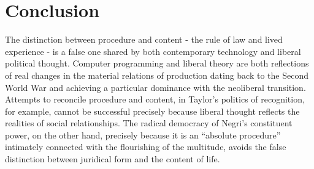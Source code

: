 \documentclass[12pt,oneside]{memoir}
\begin{document}
	
\section*{Conclusion}

The distinction between procedure and content - the rule of law and lived experience - is a false one shared by both contemporary technology and liberal political thought. Computer programming and liberal theory are both reflections of real changes in the material relations of production dating back to the Second World War and achieving a particular dominance with the neoliberal transition. Attempts to reconcile procedure and content, in Taylor's politics of recognition, for example, cannot be successful precisely because liberal thought reflects the realities of social relationships. The radical democracy of Negri's constituent power, on the other hand, precisely because it is an ``absolute procedure'' intimately connected with the flourishing of the multitude, avoids the false distinction between juridical form and the content of life.

\backmatter

 

\end{document}
